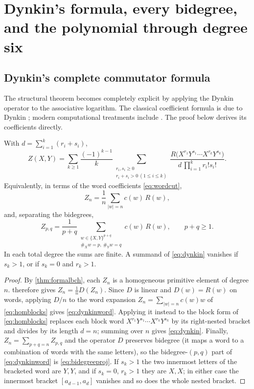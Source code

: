 \section{Dynkin's formula, every bidegree, and the polynomial through degree six}\label{sec:dynkin}
\subsection{Dynkin's complete commutator formula}
The structural theorem becomes completely explicit by applying the Dynkin
operator to the associative logarithm. The classical coefficient formula is
due to Dynkin \cite{dynkin}; modern computational treatments include
\cite{casasmurua}. The proof below derives its coefficients directly.

\begin{theorem}\label{thm:dynkin}
With $d=\sum_{i=1}^k(r_i+s_i)$,
\begin{equation}\label{eq:dynkin}
 \boxed{\displaystyle
 Z(X,Y)=\sum_{k\geq1}\frac{(-1)^{k-1}}{k}
 \sum_{\substack{r_i,s_i\geq0\\r_i+s_i>0\ (1\leq i\leq k)}}
 \frac{R\bigl(X^{r_1}Y^{s_1}\cdots X^{r_k}Y^{s_k}\bigr)}
      {d\,\prod_{i=1}^k r_i!s_i!}.}
\end{equation}
Equivalently, in terms of the word coefficients \eqref{eq:wordcut},
\begin{equation}\label{eq:dynkinword}
 Z_n=\frac1n\sum_{|w|=n}c(w)\,R(w),
\end{equation}
and, separating the bidegrees,
\begin{equation}\label{eq:bidegreeproj}
 \boxed{\displaystyle
 Z_{p,q}=\frac1{p+q}
 \sum_{\substack{w\in\{X,Y\}^{p+q}\\\#_Xw=p,\ \#_Yw=q}}
 c(w)\,R(w),\qquad p+q\geq1.}
\end{equation}
In each total degree the sums are finite. A summand of \eqref{eq:dynkin}
vanishes if $s_k>1$, or if $s_k=0$ and $r_k>1$.
\end{theorem}
\begin{proof}
By \cref{thm:formalbch}, each $Z_n$ is a homogeneous primitive element of
degree $n$.  therefore gives $Z_n=\frac1nD(Z_n)$. Since $D$ is
linear and $D(w)=R(w)$ on words, applying $D/n$ to the word expansion
$Z_n=\sum_{|w|=n}c(w)w$ of \eqref{eq:homblocks} gives \eqref{eq:dynkinword}.
Applying it instead to the block form of \eqref{eq:homblocks} replaces each
block word $X^{r_1}Y^{s_1}\cdots X^{r_k}Y^{s_k}$ by its right-nested bracket
and divides by its length $d=n$; summing over $n$ gives \eqref{eq:dynkin}.
Finally, $Z_n=\sum_{p+q=n}Z_{p,q}$ and the operator $D$ preserves bidegree
(it maps a word to a combination of words with the same letters), so the
bidegree-$(p,q)$ part of \eqref{eq:dynkinword} is \eqref{eq:bidegreeproj}.
If $s_k>1$ the two innermost letters of the bracketed word are $Y,Y$, and
if $s_k=0$, $r_k>1$ they are $X,X$; in either case the innermost bracket
$[a_{d-1},a_d]$ vanishes and so does the whole nested bracket.
\end{proof}
